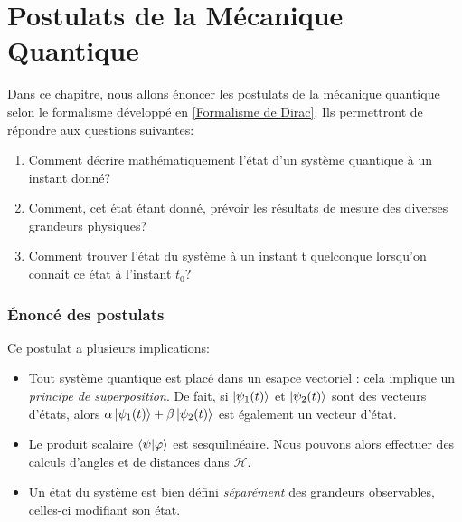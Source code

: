 \documentclass[../notesdecours.tex]{subfiles}
\begin{document}
\newpage
\part{Postulats de la Mécanique Quantique}
\label{Postulats de la Mecanique Quantique}
Dans ce chapitre, nous allons énoncer les postulats de la mécanique quantique selon le formalisme développé en \ref{Formalisme de Dirac}. Ils permettront de répondre aux questions suivantes:
\begin{enumerate}
\item Comment décrire mathématiquement l'état d'un système quantique à un instant donné?
\item Comment, cet état étant donné, prévoir les résultats de mesure des diverses grandeurs physiques?
\item Comment trouver l'état du système à un instant t quelconque lorsqu'on connait  ce état à l'instant $t_0$?
\end{enumerate}
\section{Énoncé des postulats}

\begin{center}
\end{center}
Ce postulat a plusieurs implications:
\begin{itemize}
\item Tout système quantique est placé dans un esapce vectoriel : cela implique un \textit{principe de superposition}. De fait, si $\ket{\psi_1 (t)}$ et $\ket{\psi_2 (t)}$ sont des vecteurs d'états, alors $\alpha \ket{\psi_1 (t)} + \beta\ket{\psi_2 (t)}$ est également un vecteur d'état.
\item Le produit scalaire $\braket{\psi|\varphi}$ est sesquilinéaire. Nous pouvons alors effectuer des calculs d'angles et de distances dans $\mathcal{H}$.
\item Un état du système est bien défini \textit{séparément} des grandeurs observables, celles-ci modifiant son état.
\end{itemize}
\end{document}
